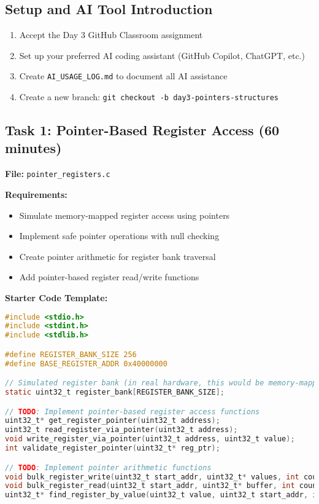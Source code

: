 \documentclass[11pt,a4paper]{article}
\begin{document}
\subsection{Setup and AI Tool Introduction}
\begin{enumerate}
    \item Accept the Day 3 GitHub Classroom assignment
    \item Set up your preferred AI coding assistant (GitHub Copilot, ChatGPT, etc.)
    \item Create \texttt{AI\_USAGE\_LOG.md} to document all AI assistance
    \item Create a new branch: \texttt{git checkout -b day3-pointers-structures}
\end{enumerate}

\subsection{Task 1: Pointer-Based Register Access (60 minutes)}

\textbf{File:} \texttt{pointer\_registers.c}

\textbf{Requirements:}
\begin{itemize}
    \item Simulate memory-mapped register access using pointers
    \item Implement safe pointer operations with null checking
    \item Create pointer arithmetic for register bank traversal
    \item Add pointer-based register read/write functions
\end{itemize}

\textbf{Starter Code Template:}
\begin{lstlisting}[language=C]
#include <stdio.h>
#include <stdint.h>
#include <stdlib.h>

#define REGISTER_BANK_SIZE 256
#define BASE_REGISTER_ADDR 0x40000000

// Simulated register bank (in real hardware, this would be memory-mapped)
static uint32_t register_bank[REGISTER_BANK_SIZE];

// TODO: Implement pointer-based register access functions
uint32_t* get_register_pointer(uint32_t address);
uint32_t read_register_via_pointer(uint32_t address);
void write_register_via_pointer(uint32_t address, uint32_t value);
int validate_register_pointer(uint32_t* reg_ptr);

// TODO: Implement pointer arithmetic functions
void bulk_register_write(uint32_t start_addr, uint32_t* values, int count);
void bulk_register_read(uint32_t start_addr, uint32_t* buffer, int count);
uint32_t* find_register_by_value(uint32_t value, uint32_t start_addr, int range);
\end{lstlisting}
\end{document}
